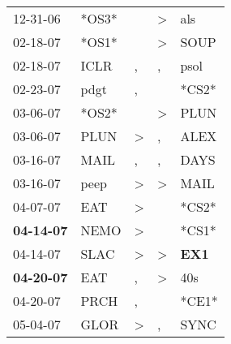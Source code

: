 \begin{supertabular}{p{0.07\textwidth}p{0.06\textwidth}p{0.02\textwidth}p{0.02\textwidth}p{0.06\textwidth}}
          12-31-06\textsuperscript{} &                            *OS3* &                  &     \textgreater &            als\textsuperscript{} \\
          02-18-07\textsuperscript{} &                            *OS1* &                  &     \textgreater &           SOUP\textsuperscript{} \\
          02-18-07\textsuperscript{} &           ICLR\textsuperscript{} &                , &                , &           psol\textsuperscript{} \\
          02-23-07\textsuperscript{} &           pdgt\textsuperscript{} &                , &                  &                            *CS2* \\
          03-06-07\textsuperscript{} &                            *OS2* &                  &     \textgreater &           PLUN\textsuperscript{} \\
          03-06-07\textsuperscript{} &           PLUN\textsuperscript{} &     \textgreater &                , &           ALEX\textsuperscript{} \\
          03-16-07\textsuperscript{} &           MAIL\textsuperscript{} &                , &                , &           DAYS\textsuperscript{} \\
          03-16-07\textsuperscript{} &           peep\textsuperscript{} &     \textgreater &     \textgreater &           MAIL\textsuperscript{} \\
          04-07-07\textsuperscript{} &            EAT\textsuperscript{} &     \textgreater &                  &                            *CS2* \\
 \textbf{04-14-07\textsuperscript{}} &           NEMO\textsuperscript{} &     \textgreater &                  &                            *CS1* \\
          04-14-07\textsuperscript{} &           SLAC\textsuperscript{} &     \textgreater &     \textgreater &   \textbf{EX1\textsuperscript{}} \\
 \textbf{04-20-07\textsuperscript{}} &            EAT\textsuperscript{} &                , &     \textgreater &            40s\textsuperscript{} \\
          04-20-07\textsuperscript{} &           PRCH\textsuperscript{} &                , &                  &                            *CE1* \\
          05-04-07\textsuperscript{} &           GLOR\textsuperscript{} &     \textgreater &                , &           SYNC\textsuperscript{} \\

\end{supertabular}
